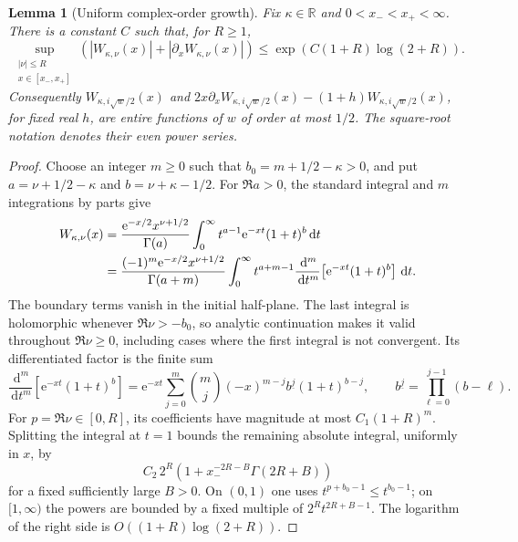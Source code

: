 \documentclass[11pt,letterpaper]{article}
\numberwithin{equation}{section}
\newtheorem{lemma}[theorem]{Lemma}
\theoremstyle{definition}
\theoremstyle{remark}
\newcommand{\R}{\mathbb R}
\newcommand{\dd}{\,\mathrm d}
\newcommand{\e}{\mathrm e}
\begin{document}
\begin{lemma}[Uniform complex-order growth]
\label{lem:complexwhittakergrowth}
Fix $\kappa\in\R$ and $0<x_-<x_+<\infty$. There is a constant $C$ such that, for $R\geq1$,
\begin{equation}
 \sup_{\substack{|\nu|\leq R\\x\in[x_-,x_+]}}
 \left(|W_{\kappa,\nu}(x)|+|\partial_xW_{\kappa,\nu}(x)|\right)
 \leq \exp\!\left(C(1+R)\log(2+R)\right).
 \label{eq:complexwhittakerbound}
\end{equation}
Consequently $W_{\kappa,i\sqrt w/2}(x)$ and
$2x\partial_xW_{\kappa,i\sqrt w/2}(x)-(1+h)W_{\kappa,i\sqrt w/2}(x)$, for fixed real $h$, are entire functions of $w$ of order at most $1/2$. The square-root notation denotes their even power series.
\end{lemma}
\begin{proof}
Choose an integer $m\geq0$ such that $b_0=m+1/2-\kappa>0$, and put
$a=\nu+1/2-\kappa$ and $b=\nu+\kappa-1/2$. For $\Re a>0$, the standard integral and $m$ integrations by parts give
\begin{align}
 W_{\kappa,\nu}(x)
 &=\frac{\e^{-x/2}x^{\nu+1/2}}{\Gamma(a)}
   \int_0^\infty t^{a-1}\e^{-xt}(1+t)^b\dd t\notag\\
 &=\frac{(-1)^m\e^{-x/2}x^{\nu+1/2}}{\Gamma(a+m)}
   \int_0^\infty t^{a+m-1}
   \frac{\dd^m}{\dd t^m}\!\left[\e^{-xt}(1+t)^b\right]\dd t.
 \label{eq:continuedwhittakerintegral}
\end{align}
The boundary terms vanish in the initial half-plane. The last integral is holomorphic whenever $\Re\nu>-b_0$, so analytic continuation makes it valid throughout $\Re\nu\geq0$, including cases where the first integral is not convergent. Its differentiated factor is the finite sum
\begin{equation}
 \frac{\dd^m}{\dd t^m}\!\left[\e^{-xt}(1+t)^b\right]
 =\e^{-xt}\sum_{j=0}^{m}\binom mj(-x)^{m-j}
       b^{\underline j}(1+t)^{b-j},
 \qquad b^{\underline j}=\prod_{\ell=0}^{j-1}(b-\ell).
 \label{eq:whittakerfiniteparts}
\end{equation}
For $p=\Re\nu\in[0,R]$, its coefficients have magnitude at most $C_1(1+R)^m$. Splitting the integral at $t=1$ bounds the remaining absolute integral, uniformly in $x$, by
\begin{equation}
 C_2\,2^R\left(1+x_-^{-2R-B}\Gamma(2R+B)\right)
 \label{eq:whittakerintegralmajorant}
\end{equation}
for a fixed sufficiently large $B>0$. On $(0,1)$ one uses $t^{p+b_0-1}\leq t^{b_0-1}$; on $[1,\infty)$ the powers are bounded by a fixed multiple of $2^Rt^{2R+B-1}$. The logarithm of the right side is $O((1+R)\log(2+R))$.


\end{proof}
\end{document}
